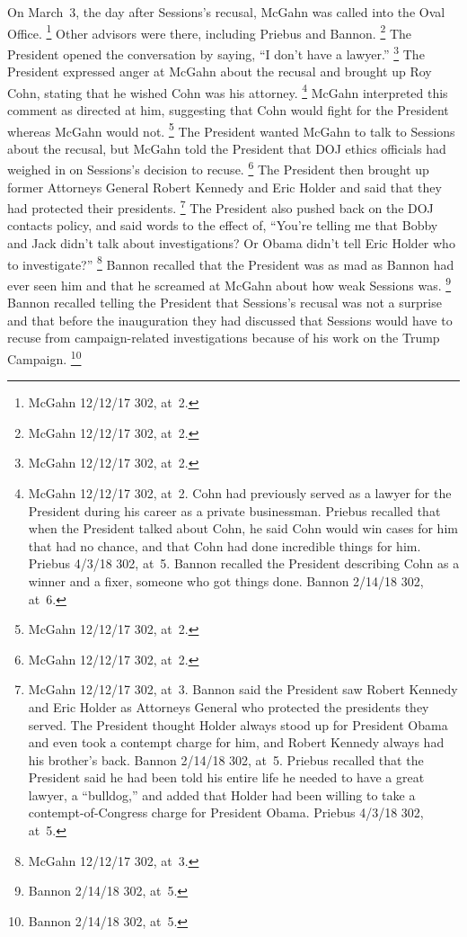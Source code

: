 On March~3, the day after Sessions's recusal, McGahn was called into the Oval Office.%
\footnote{McGahn 12/12/17 302, at~2.}
Other advisors were there, including Priebus and Bannon.%
\footnote{McGahn 12/12/17 302, at~2.}
The President opened the conversation by saying, ``I don't have a lawyer.''%
\footnote{McGahn 12/12/17 302, at~2.}
The President expressed anger at McGahn about the recusal and brought up Roy Cohn, stating that he wished Cohn was his attorney.%
\footnote{McGahn 12/12/17 302, at~2.
Cohn had previously served as a lawyer for the President during his career as a private businessman.
Priebus recalled that when the President talked about Cohn, he said Cohn would win cases for him that had no chance, and that Cohn had done incredible things for him.
Priebus 4/3/18 302, at~5.
Bannon recalled the President describing Cohn as a winner and a fixer, someone who got things done.
Bannon 2/14/18 302, at~6.}
McGahn interpreted this comment as directed at him, suggesting that Cohn would fight for the President whereas McGahn would not.%
\footnote{McGahn 12/12/17 302, at~2.}
The President wanted McGahn to talk to Sessions about the recusal, but McGahn told the President that DOJ ethics officials had weighed in on Sessions's decision to recuse.%
\footnote{McGahn 12/12/17 302, at~2.}
The President then brought up former Attorneys General Robert Kennedy and Eric Holder and said that they had protected their presidents.%
\footnote{McGahn 12/12/17 302, at~3.
Bannon said the President saw Robert Kennedy and Eric Holder as Attorneys General who protected the presidents they served.
The President thought Holder always stood up for President Obama and even took a contempt charge for him, and Robert Kennedy always had his brother's back.
Bannon 2/14/18 302, at~5.
Priebus recalled that the President said he had been told his entire life he needed to have a great lawyer, a ``bulldog,'' and added that Holder had been willing to take a contempt-of-Congress charge for President Obama.
Priebus 4/3/18 302, at~5.}
The President also pushed back on the DOJ contacts policy, and said words to the effect of, ``You're telling me that Bobby and Jack didn't talk about investigations?
Or Obama didn't tell Eric Holder who to investigate?''%
\footnote{McGahn 12/12/17 302, at~3.}
Bannon recalled that the President was as mad as Bannon had ever seen him and that he screamed at McGahn about how weak Sessions was.%
\footnote{Bannon 2/14/18 302, at~5.}
Bannon recalled telling the President that Sessions's recusal was not a surprise and that before the inauguration they had discussed that Sessions would have to recuse from campaign-related investigations because of his work on the Trump Campaign.%
\footnote{Bannon 2/14/18 302, at~5.}

